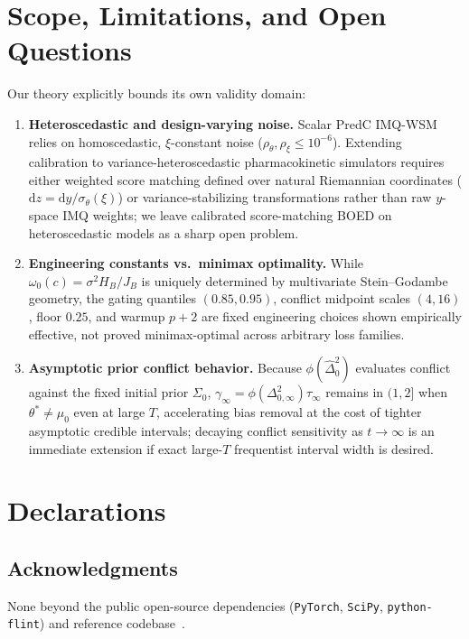 \documentclass[11pt,a4paper,reqno]{amsart}
\theoremstyle{definition}
\theoremstyle{remark}
\begin{document}
\section{Scope, Limitations, and Open Questions}\label{sec:scope}

Our theory explicitly bounds its own validity domain:
\begin{enumerate}[label=\arabic*.]
\item \textbf{Heteroscedastic and design-varying noise.} Scalar PredC IMQ-WSM relies on homoscedastic, $\xi$-constant noise ($\rho_\theta, \rho_\xi \le 10^{-6}$). Extending calibration to variance-heteroscedastic pharmacokinetic simulators requires either weighted score matching defined over natural Riemannian coordinates ($\mathrm{d}z = \mathrm{d}y / \sigma_\theta(\xi)$) or variance-stabilizing transformations rather than raw $y$-space IMQ weights; we leave calibrated score-matching BOED on heteroscedastic models as a sharp open problem.
\item \textbf{Engineering constants vs.\ minimax optimality.} While $\omega_0(c) = \sigma^2 H_B/J_B$ is uniquely determined by multivariate Stein--Godambe geometry, the gating quantiles $(0.85, 0.95)$, conflict midpoint scales $(4, 16)$, floor $0.25$, and warmup $p+2$ are fixed engineering choices shown empirically effective, not proved minimax-optimal across arbitrary loss families.
\item \textbf{Asymptotic prior conflict behavior.} Because $\phi(\hat{\Delta}_0^2)$ evaluates conflict against the fixed initial prior $\Sigma_0$, $\gamma_\infty = \phi(\Delta_{0,\infty}^2)\tau_\infty$ remains in $(1, 2]$ when $\theta^* \neq \mu_0$ even at large $T$, accelerating bias removal at the cost of tighter asymptotic credible intervals; decaying conflict sensitivity as $t \to \infty$ is an immediate extension if exact large-$T$ frequentist interval width is desired.
\end{enumerate}

\section*{Declarations}

\subsection*{Acknowledgments}
None beyond the public open-source dependencies (\texttt{PyTorch}, \texttt{SciPy}, \texttt{python-flint}) and reference codebase~\cite{barlas2025gboed}.
\end{document}
